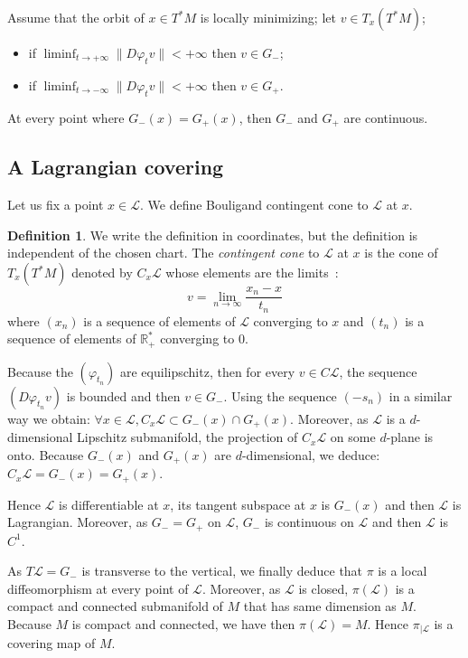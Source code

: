 \documentclass{dcds}
\theoremstyle{definition}
\newtheorem{definition}[theorem]{Definition}
\begin{document}
Assume that the orbit of $x\in T^*M$ is locally minimizing; let $v\in T_x(T^*M)$;
\begin{itemize}
\item  if $\displaystyle{\liminf_{t\rightarrow +\infty} \| D\varphi_t v\|<+\infty}$ then $v\in G_-$;
\item if $\displaystyle{\liminf_{t\rightarrow -\infty} \| D\varphi_t v\|<+\infty}$ then $v\in G_+$.
\end{itemize}

At every point where $G_-(x)=G_+(x)$, then $G_-$ and $G_+$ are continuous.

\subsection{A Lagrangian covering}
Let us fix a point $x\in {\mathcal {L}}$. We define Bouligand  contingent cone to ${\mathcal {L}}$ at $x$.

\begin{definition}
We write the definition in coordinates, but the definition is independent of the chosen chart. The   {\em contingent cone} to ${\mathcal {L}}$ at $x$ is the cone of $T_x(T^*M)$ denoted by {$C_x{\mathcal {L}}$} whose elements  are the limits~:
$$v=\lim_{ n\rightarrow \infty} \frac{x_n-x}{ t_n} $$
where $(x_n)$  is a sequence  of elements of ${\mathcal {L}}$ converging to $x$ and  $(t_n)$ is a sequence of elements of ${\mathbb {R}}_+^*$ converging to $0$.
\end{definition}
Because the $(\varphi_{t_n})$ are equilipschitz, then for every $v\in C{\mathcal {L}}$, the sequence $(D\varphi_{t_n}v)$ is bounded and then $v\in G_-$. Using the sequence $(-s_n)$ in a similar way we obtain: $\forall x\in{\mathcal {L}}, C_x{\mathcal {L}}\subset G_-(x)\cap G_+(x)$.
Moreover, as ${\mathcal {L}}$ is a $d$-dimensional  Lipschitz submanifold, the projection of $C_x{\mathcal {L}}$ on some $d$-plane is onto.  Because $G_-(x)$ and $G_+(x)$ are $d$-dimensional, we deduce: $C_x{\mathcal {L}}=G_-(x)=G_+(x)$.

Hence ${\mathcal {L}}$ is differentiable at $x$, its tangent subspace at $x$ is $G_-(x)$ and then ${\mathcal {L}}$ is Lagrangian. Moreover, as $G_-=G_+$ on ${\mathcal {L}}$, $G_-$ is continuous on ${\mathcal {L}}$ and then ${\mathcal {L}}$ is $C^1$.

As $T{\mathcal {L}}=G_-$ is transverse to the vertical, we finally deduce that $\pi$ is a local diffeomorphism at every point of ${\mathcal {L}}$. Moreover, as ${\mathcal {L}}$ is closed, $\pi({\mathcal {L}})$ is a  compact and connected submanifold of $M$ that has same dimension as $M$. Because $M$ is compact and connected, we have then $\pi({\mathcal {L}})=M$. Hence $\pi_{|{\mathcal {L}}}$ is a covering map of $M$.
\end{document}
